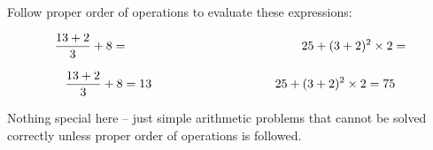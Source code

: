 

Follow proper order of operations to evaluate these expressions:

$${13 + 2 \over 3} + 8 = \hskip 140pt 25 + (3 + 2)^2 \times 2 = $$







$${13 + 2 \over 3} + 8 = 13 \hskip 100pt 25 + (3 + 2)^2 \times 2 = 75$$







Nothing special here -- just simple arithmetic problems that cannot be solved correctly unless proper order of operations is followed.





